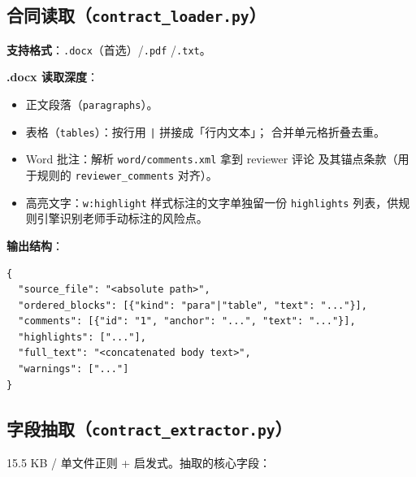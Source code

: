 \documentclass[11pt,a4paper]{article}
\begin{document}
\subsection{合同读取（\texttt{contract\_loader.py}）}

\textbf{支持格式}：\texttt{.docx}（首选）/\texttt{.pdf} /\texttt{.txt}。

\textbf{.docx 读取深度}：

\begin{itemize}[leftmargin=1.4em,itemsep=1pt]
  \item 正文段落（\texttt{paragraphs}）。
  \item 表格（\texttt{tables}）：按行用 \texttt{|} 拼接成「行内文本」；
    合并单元格折叠去重。
  \item Word 批注：解析 \texttt{word/comments.xml} 拿到 reviewer 评论
    及其锚点条款（用于规则的 \texttt{reviewer\_comments} 对齐）。
  \item 高亮文字：\texttt{w:highlight} 样式标注的文字单独留一份
    \texttt{highlights} 列表，供规则引擎识别老师手动标注的风险点。
\end{itemize}

\textbf{输出结构}：

\begin{lstlisting}[style=json]
{
  "source_file": "<absolute path>",
  "ordered_blocks": [{"kind": "para"|"table", "text": "..."}],
  "comments": [{"id": "1", "anchor": "...", "text": "..."}],
  "highlights": ["..."],
  "full_text": "<concatenated body text>",
  "warnings": ["..."]
}
\end{lstlisting}

\subsection{字段抽取（\texttt{contract\_extractor.py}）}

15.5 KB / 单文件正则 + 启发式。抽取的核心字段：
\end{document}
